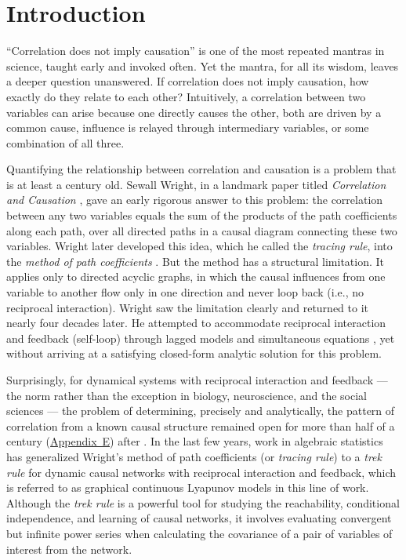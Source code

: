 \documentclass[12pt]{article}
\begin{document}

\clearpage
\section*{Introduction}

``Correlation does not imply causation'' is one of the most
repeated mantras in science, taught early and invoked often.
Yet the mantra, for all its wisdom, leaves a deeper question
unanswered. If correlation does not imply causation, how
exactly do they relate to each other?
Intuitively, a correlation between two variables can arise because one
directly causes the other, both are driven by a common cause, influence is relayed through intermediary variables, or some
combination of all three.

Quantifying the relationship between correlation and causation is a problem that is at least a century old.
Sewall Wright, in a landmark paper titled \textit{Correlation
and Causation} \citep{Wright1921}, gave an early rigorous answer to this problem:
the correlation between any two variables equals the sum of
the products of the path coefficients along each path, over
all directed paths in a causal diagram connecting these two
variables.
Wright later developed this idea, which he called the
\textit{tracing rule}, into the \textit{method of path
coefficients} \citep{Wright1934}.
But the method has a structural limitation. It applies only
to directed acyclic graphs, in which the causal influences
from one variable to another flow only in one direction and
never loop back (i.e., no reciprocal interaction).
Wright saw the limitation clearly and returned to it nearly
four decades later.
He attempted to accommodate reciprocal interaction and
feedback (self-loop) through lagged models and simultaneous
equations \citep{Wright1960}, yet without
arriving at a satisfying closed-form analytic solution for
this problem.

Surprisingly, for dynamical systems with reciprocal
interaction and feedback --- the norm rather than the
exception in biology, neuroscience, and the social sciences
--- the problem of determining, precisely and analytically,
the pattern of correlation from a
known causal structure remained open
for more than half of a century (\hyperref[app:appE]{Appendix~E}) after \citet{Wright1960}.
In the last few years, work in algebraic statistics has
generalized Wright's method of path coefficients (or
\textit{tracing rule}) to a \textit{trek rule}
\citep{VarandoHansen2020, HansenTrek2025} for dynamic causal networks with reciprocal
interaction and feedback, which is referred to as graphical continuous Lyapunov models in this line of work. Although the \textit{trek rule} is a powerful tool for studying the reachability, conditional independence, and learning of causal networks, it involves evaluating convergent but infinite power series when calculating the covariance of a pair of variables of interest from the network.
\end{document}
